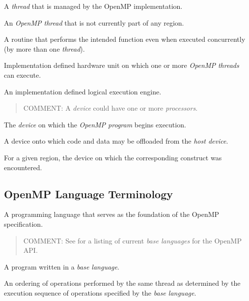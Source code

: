 \glossarydefstart
A \emph{thread} that is managed by the OpenMP implementation.
\glossarydefend

\glossarydefstart
An \emph{OpenMP thread} that is not currently part of any 
 region.
\glossarydefend

\glossarydefstart
A routine that performs the intended function even when executed concurrently
(by more than one \emph{thread}).
\glossarydefend

\glossarydefstart
Implementation defined hardware unit on which one or more 
\emph{OpenMP threads} can execute.
\glossarydefend

\glossarydefstart
An implementation defined logical execution engine.

\begin{quote}
COMMENT: A \emph{device} could have one or more \emph{processors}.
\end{quote}
\glossarydefend

\glossarydefstart
The \emph{device} on which the \emph{OpenMP program} begins execution.
\glossarydefend

\glossarydefstart
A device onto which code and data may be offloaded from the \emph{host device}.
\glossarydefend

\glossarydefstart
For a given  region, the device on which the corresponding 
 construct was encountered.
\glossarydefend

% 
\subsection{OpenMP Language Terminology}
\label{subsec:OpenMP Language Terminology}
\glossarydefstart
A programming language that serves as the foundation of the OpenMP
specification.

\begin{quote}
COMMENT: See 
for a listing of current \emph{base languages} for the OpenMP API.
\end{quote}
\glossarydefend

\glossarydefstart
A program written in a \emph{base language}.
\glossarydefend

\glossarydefstart
An ordering of operations performed by the same thread as determined by the
execution sequence of operations specified by the \emph{base language}.

